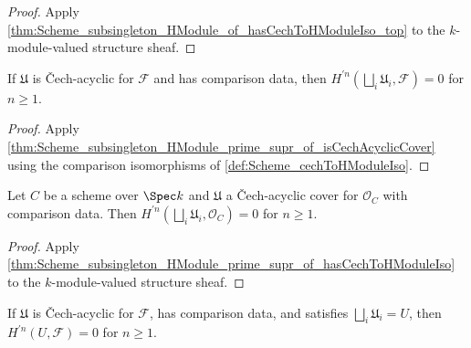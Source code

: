 \begin{proof}


\leanok
  Apply \cref{thm:Scheme_subsingleton_HModule_of_hasCechToHModuleIso_top} to the \(k\)-module-valued structure sheaf.
\end{proof}

\begin{theorem}\leanok
  \label{thm:Scheme_subsingleton_HModule_prime_supr_of_hasCechToHModuleIso}

  If \(\mathfrak U\) is \v{C}ech-acyclic for \(\mathcal F\) and has comparison data, then \(H^{\prime n}(\bigsqcup_i\mathfrak U_i,\mathcal F)=0\) for \(n\geq1\).
\end{theorem}

\begin{proof}


\leanok
  Apply \cref{thm:Scheme_subsingleton_HModule_prime_supr_of_isCechAcyclicCover} using the comparison isomorphisms of \cref{def:Scheme_cechToHModuleIso}.
\end{proof}

\begin{theorem}\leanok
  \label{thm:Scheme_subsingleton_HModule_prime_supr_of_hasCechToHModuleIso_curve}

  Let \(C\) be a scheme over \(\Spec k\) and \(\mathfrak U\) a \v{C}ech-acyclic cover for \(\mathcal O_C\) with comparison data. Then \(H^{\prime n}(\bigsqcup_i\mathfrak U_i,\mathcal O_C)=0\) for \(n\geq1\).
\end{theorem}

\begin{proof}


\leanok
  Apply \cref{thm:Scheme_subsingleton_HModule_prime_supr_of_hasCechToHModuleIso} to the \(k\)-module-valued structure sheaf.
\end{proof}

\begin{theorem}\leanok
  \label{thm:Scheme_subsingleton_HModule_prime_of_hasCechToHModuleIso}

  If \(\mathfrak U\) is \v{C}ech-acyclic for \(\mathcal F\), has comparison data, and satisfies \(\bigsqcup_i\mathfrak U_i=U\), then \(H^{\prime n}(U,\mathcal F)=0\) for \(n\geq1\).
\end{theorem}

